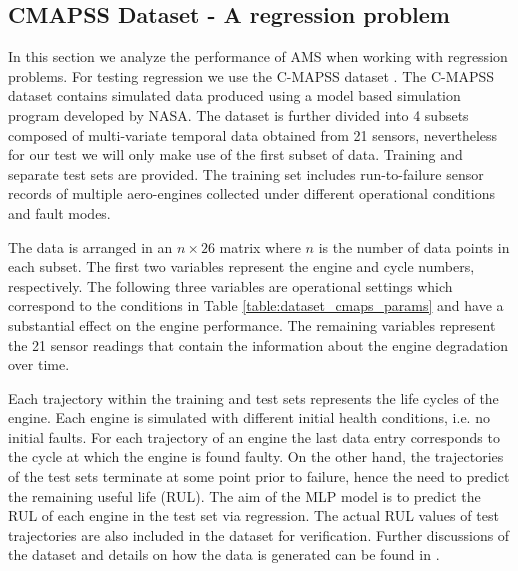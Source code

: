 \documentclass[journal]{IEEEtran}
\begin{document}
\subsection{CMAPSS Dataset - A regression problem}

In this section we analyze the performance of AMS when working with regression problems. For testing regression we use the C-MAPSS dataset \cite{CMAPS2008}. The C-MAPSS dataset contains simulated data produced using a model based simulation program developed by NASA. The dataset is further divided into 4 subsets composed of multi-variate temporal data obtained from 21 sensors, nevertheless for our test we will only make use of the first subset of data. Training and separate test sets are provided. The training set includes run-to-failure sensor records of multiple aero-engines collected under different operational conditions and fault modes.

The data is arranged in an $n\times26$ matrix where $n$ is the number of data points in each subset. The first two variables represent the engine and cycle
numbers, respectively. The following three variables are operational settings which correspond to the conditions in Table \ref{table:dataset_cmaps_params} and have a
substantial effect on the engine performance. The remaining variables represent the 21 sensor readings that contain the information about the engine
degradation over time.

\begin{table}[!htb]
\begin{center}
\end{center}
\caption{CMAPSS dataset details.}
\label{table:dataset_cmaps_params}
\end{table}

Each trajectory within the training and test sets represents the life cycles of the engine. Each engine is simulated with different initial health conditions, i.e. no initial faults. For each trajectory of an engine the last data entry corresponds to the cycle at which the engine is found faulty. On the other hand, the trajectories of the test sets terminate at some point prior to failure, hence the need to predict the remaining useful life (RUL). The aim of the MLP model is to predict the RUL of each engine in the test set via regression. The actual RUL values of test trajectories are also included in the dataset for verification. Further discussions of the dataset and details on how the data is generated can be found in \cite{Saxena2008}.
\end{document}
